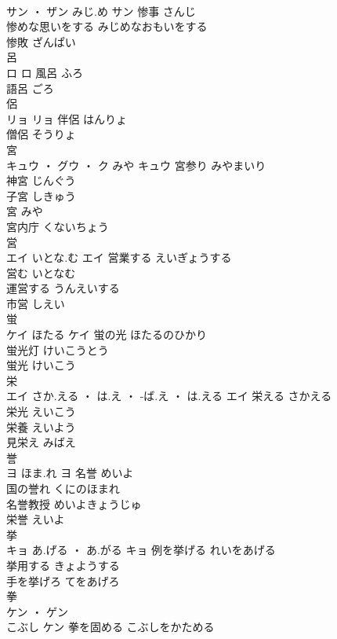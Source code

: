\documentclass[8pt]{extreport}
\begin{document}
\begin{CJK}{UTF8}{min}
\\	サン ・ ザン	みじ.め	サン	惨事	さんじ	
\\	惨めな思いをする	みじめなおもいをする	
\\	惨敗	ざんぱい	
\\	呂	
\\	ロ		ロ	風呂	ふろ	
\\	語呂	ごろ	
\\	侶	
\\	リョ		リョ	伴侶	はんりょ	
\\	僧侶	そうりょ	
\\	宮	
\\	キュウ ・ グウ ・ ク	みや	キュウ	宮参り	みやまいり	
\\	神宮	じんぐう	
\\	子宮	しきゅう	
\\	宮	みや	
\\	宮内庁	くないちょう	
\\	営	
\\	エイ	いとな.む	エイ	営業する	えいぎょうする	
\\	営む	いとなむ	
\\	運営する	うんえいする	
\\	市営	しえい	
\\	蛍	
\\	ケイ	ほたる	ケイ	蛍の光	ほたるのひかり	
\\	蛍光灯	けいこうとう	
\\	蛍光	けいこう	
\\	栄	
\\	エイ	さか.える ・ は.え ・ -ば.え ・ は.える	エイ	栄える	さかえる	
\\	栄光	えいこう	
\\	栄養	えいよう	
\\	見栄え	みばえ	
\\	誉	
\\	ヨ	ほま.れ	ヨ	名誉	めいよ	
\\	国の誉れ	くにのほまれ	
\\	名誉教授	めいよきょうじゅ	
\\	栄誉	えいよ	
\\	挙	
\\	キョ	あ.げる ・ あ.がる	キョ	例を挙げる	れいをあげる	
\\	挙用する	きょようする	
\\	手を挙げろ	てをあげろ	
\\	拳	
\\	ケン ・ ゲン
\\	こぶし	ケン	拳を固める	こぶしをかためる	

\end{CJK}
\end{document}
